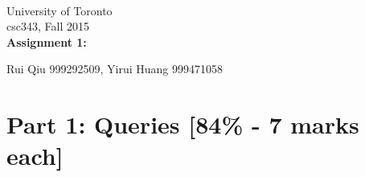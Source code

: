 \documentclass{article}
\begin{document}
~~~\vspace{-2.0cm}

\noindent
University of Toronto\\
{\sc csc}343, Fall 2015\\[10pt]
{\LARGE\bf Assignment 1:\\[5pt]
}

Rui Qiu 999292509, Yirui Huang 999471058\\[5pt]

\section*{Part 1: Queries [84\% - 7 marks each]}
\end{document}

